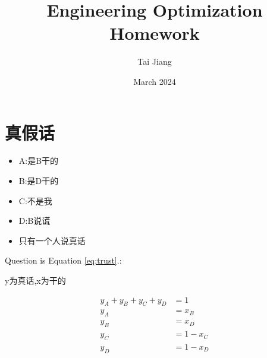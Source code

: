 \documentclass{article}
\title{Engineering Optimization Homework}
\author{Tai Jiang}
\date{March 2024}
\begin{document}
  \maketitle
  \section{真假话}
  \begin{itemize}
    \item A:是B干的
    \item B:是D干的
    \item C:不是我
    \item D:B说谎
    \item 只有一个人说真话
  \end{itemize}

  Question is Equation \ref{eq:trust}.:

  y为真话,x为干的

  \begin{equation}
    \begin{aligned}
      y_A + y_B + y_C + y_D &= 1 \\
      y_A &= x_B \\
      y_B &= x_D \\
      y_C &= 1 - x_C \\
      y_D &= 1 - x_D \\
    \end{aligned}
    \label{eq:trust}
  \end{equation}
\end{document}
